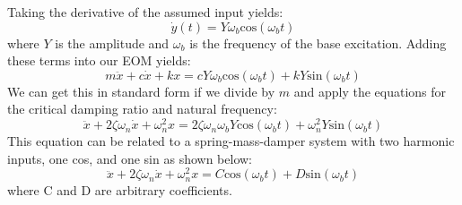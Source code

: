 \documentclass[12pt,letter]{article}
\begin{document}
	Taking the derivative of the assumed input yields:
	\begin{equation}
	\dot{y}(t) = Y \omega_b \text{cos}(\omega_b t)
	\end{equation}
	where $Y$ is the amplitude and $\omega_b$ is the frequency of the base excitation. Adding these terms into our EOM yields:
	\begin{equation}
	m\ddot{x} + c\dot{x} + kx = c Y \omega_b \text{cos}(\omega_b t)  + k Y\text{sin}(\omega_b t)  
	\end{equation}
	We can get this in standard form if we divide by $m$ and apply the equations for the critical damping ratio and natural frequency:
	\begin{equation}
	\ddot{x} + 2 \zeta \omega_n \dot{x} + \omega_n^2x = 2 \zeta \omega_n \omega_b Y \text{cos}(\omega_b t)  + \omega_n^2 Y\text{sin}(\omega_b t)
	\label{eq:standard_form_base_excitation}  
	\end{equation}
	This equation can be related to a spring-mass-damper system with two harmonic inputs, one cos, and one sin as shown below:
	\begin{equation}
	\ddot{x} + 2 \zeta \omega_n \dot{x} + \omega_n^2x = C \text{cos}(\omega_b t)  + D \text{sin}(\omega_b t)  
	\label{eq:standard_form_base_excitation_CD}
	\end{equation}
	where C and D are arbitrary coefficients. 
\end{document}
